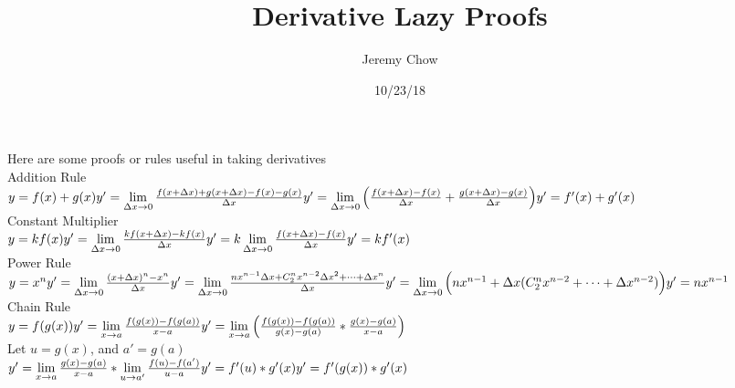 \documentclass[12pt]{article}
\title{Derivative Lazy Proofs}
\author{Jeremy Chow}
\date{10/23/18}
\begin{document}
\maketitle
Here are some proofs or rules useful in taking derivatives\\Addition Rule\\
$y=f(x)+g(x)\\y'=\lim\limits_{\Delta x \to 0} \frac{f(x+\Delta x)+g(x+\Delta x)-f(x)-g(x)}{\Delta x}\\y'=\lim\limits_{\Delta x \to 0} \Big( \frac{f(x+\Delta x)-f(x)}{\Delta x}+\frac{g(x+\Delta x)-g(x)}{\Delta x} \Big )\\y'=f'(x)+g'(x)$\\Constant Multiplier\\$y=kf(x)\\y'=\lim\limits_{\Delta x \to 0} \frac{kf(x+\Delta x)-kf(x)}{\Delta x}\\y'=k\lim\limits_{\Delta x \to 0} \frac{f(x+\Delta x)-f(x)}{\Delta x}\\y'=kf'(x)$\\Power Rule\\$y=x^n\\y'=\lim\limits_{\Delta x \to 0} \frac{(x+\Delta x)^n-x^n}{\Delta x}\\y'=\lim\limits_{\Delta x \to 0} \frac{nx^{n-1}\Delta x+C_{2}^nx^{n-2}\Delta x^2+\dotsb+\Delta x^n}{\Delta x}\\y'=\lim\limits_{\Delta x \to 0} \Big ( nx^{n-1}+\Delta x(C_{2}^nx^{n-2}+\dotsb+\Delta x^{n-2})\Big )\\y'=nx^{n-1}$\\Chain Rule\\$y=f(g(x))\\y'=\lim\limits_{x \to a} \frac{f(g(x))-f(g(a))}{x-a}\\y'=\lim\limits_{x \to a}\Big( \frac{f(g(x))-f(g(a))}{g(x)-g(a)}*\frac{g(x)-g(a)}{x-a}\Big)$\\Let $u=g(x)$, and $a'=g(a)$\\$y'=\lim\limits_{x \to a} \frac{g(x)-g(a)}{x-a}*\lim\limits_{u \to a'} \frac{f(u)-f(a')}{u-a}\\y'=f'(u)*g'(x)\\y'=f'(g(x))*g'(x)$
\end{document}
